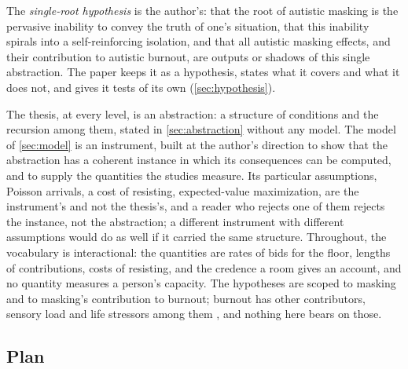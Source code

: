 The \emph{single-root hypothesis} is the author's: that the root of autistic masking is the pervasive inability to convey the truth of one's situation, that this inability spirals into a self-reinforcing isolation, and that all autistic masking effects, and their contribution to autistic burnout, are outputs or shadows of this single abstraction. The paper keeps it as a hypothesis, states what it covers and what it does not, and gives it tests of its own (\autoref{sec:hypothesis}).

The thesis, at every level, is an abstraction: a structure of conditions and the recursion among them, stated in \autoref{sec:abstraction} without any model. The model of \autoref{sec:model} is an instrument, built at the author's direction to show that the abstraction has a coherent instance in which its consequences can be computed, and to supply the quantities the studies measure. Its particular assumptions, Poisson arrivals, a cost of resisting, expected-value maximization, are the instrument's and not the thesis's, and a reader who rejects one of them rejects the instance, not the abstraction; a different instrument with different assumptions would do as well if it carried the same structure. Throughout, the vocabulary is interactional: the quantities are rates of bids for the floor, lengths of contributions, costs of resisting, and the credence a room gives an account, and no quantity measures a person's capacity. The hypotheses are scoped to masking and to masking's contribution to burnout; burnout has other contributors, sensory load and life stressors among them \cite{Raymaker2020, Mantzalas2022a}, and nothing here bears on those.

\subsection{Plan}

